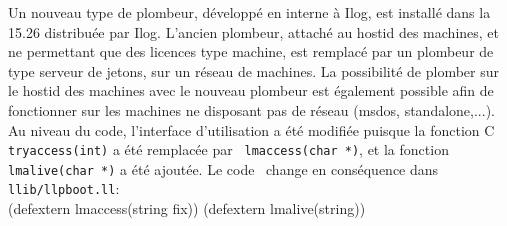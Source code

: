 Un nouveau type de plombeur, d\'{e}velopp\'{e} en interne \`{a} Ilog, est
install\'{e} dans la 15.26 distribu\'{e}e par Ilog. L'ancien plombeur,
attach\'{e} au hostid des 
machines, et ne permettant que des licences type machine, est
remplac\'{e} par un plombeur de type serveur de jetons, sur un r\'{e}seau de
machines. La possibilit\'{e} de plomber sur le hostid des machines avec le
nouveau plombeur est \'{e}galement possible afin de fonctionner sur les machines
ne disposant pas de r\'{e}seau (msdos, standalone,...). \\
Au niveau du code, l'interface d'utilisation a \'{e}t\'{e} modifi\'{e}e puisque
la fonction C {\tt tryaccess(int)} a \'{e}t\'{e} remplac\'{e}e par {\tt
lmaccess(char *)}, et la fonction {\tt lmalive(char *)} a \'{e}t\'{e}
ajout\'{e}e.
Le code \LeLisp\ change en cons\'{e}quence dans {\tt llib/llpboot.ll}: \\
\BeginLL
(defextern lmaccess(string fix))
(defextern lmalive(string))
\EndLL


